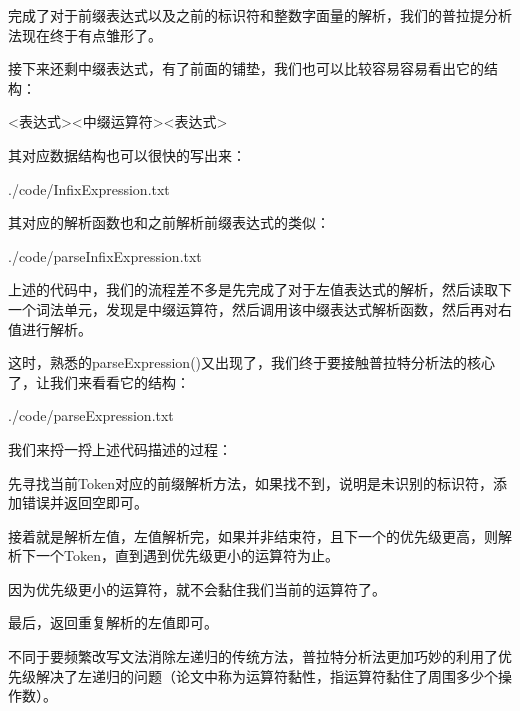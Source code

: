 \documentclass{beamer}
\begin{document}
	\begin{frame}
		完成了对于前缀表达式以及之前的标识符和整数字面量的解析，我们的普拉提分析法现在终于有点雏形了。
		
		接下来还剩中缀表达式，有了前面的铺垫，我们也可以比较容易容易看出它的结构：
		
		<表达式><中缀运算符><表达式>
		
		其对应数据结构也可以很快的写出来：
		
		
		{./code/InfixExpression.txt}
	\end{frame}
	
	\begin{frame}
		其对应的解析函数也和之前解析前缀表达式的类似：
		
		
		{./code/parseInfixExpression.txt}
		
		上述的代码中，我们的流程差不多是先完成了对于左值表达式的解析，然后读取下一个词法单元，发现是中缀运算符，然后调用该中缀表达式解析函数，然后再对右值进行解析。
	\end{frame}

	\begin{frame}
		这时，熟悉的parseExpression()又出现了，我们终于要接触普拉特分析法的核心了，让我们来看看它的结构：
		
		
		{./code/parseExpression.txt}
	\end{frame}

	\begin{frame}
		我们来捋一捋上述代码描述的过程：
		
		先寻找当前Token对应的前缀解析方法，如果找不到，说明是未识别的标识符，添加错误并返回空即可。
		
		接着就是解析左值，左值解析完，如果并非结束符，且下一个的优先级更高，则解析下一个Token，直到遇到优先级更小的运算符为止。
		
		因为优先级更小的运算符，就不会黏住我们当前的运算符了。
		
		最后，返回重复解析的左值即可。
		
		不同于要频繁改写文法消除左递归的传统方法，普拉特分析法更加巧妙的利用了优先级解决了左递归的问题（论文中称为运算符黏性，指运算符黏住了周围多少个操作数）。
		
	\end{frame}
\end{document}
